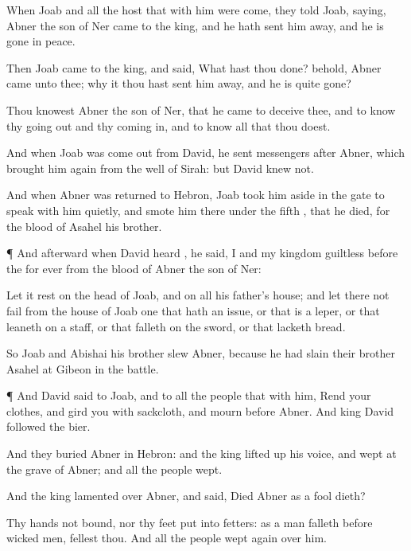 {When
Joab and all the
host that
{} with him were
come, they
told
Joab,
saying,
Abner the
son of
Ner
came to the
king, and he hath sent him
away, and he is
gone in
peace.

Then
Joab
came to the
king, and
said, What hast thou
done? behold,
Abner
came unto thee; why
{} it
{} thou hast sent him
away, and he is
quite
gone?

Thou
knowest
Abner the
son of
Ner, that he
came to
deceive thee, and to
know thy going
out and thy coming
in, and to
know all that thou
doest.

And when
Joab was come
out from
David, he
sent
messengers
after
Abner, which brought him
again from the
well of
Sirah: but
David
knew
{} not.

And when
Abner was
returned to
Hebron,
Joab took him
aside
in the
gate to
speak with him
quietly, and
smote him there under the
fifth
{}, that he
died, for the
blood of
Asahel his
brother.


\par }{\PP {}¶ And
afterward when
David
heard
{}, he
said, I and my
kingdom
{}
guiltless before the
{}
for
ever from the
blood of
Abner the
son of
Ner:

Let it
rest on the
head of
Joab, and on all his
father’s
house; and let there not
fail from the
house of
Joab one that hath an
issue, or that is a
leper, or that
leaneth on a
staff, or that
falleth on the
sword, or that
lacketh
bread.

So
Joab and
Abishai his
brother
slew
Abner, because he had
slain their
brother
Asahel at
Gibeon in the
battle.


\par }{\PP {}¶ And
David
said to
Joab, and to all the
people that
{} with him,
Rend your
clothes, and
gird you with
sackcloth, and
mourn
before
Abner. And
king
David
{}
followed the
bier.

And they
buried
Abner in
Hebron: and the
king lifted
up his
voice, and
wept at the
grave of
Abner; and all the
people
wept.

And the
king
lamented over
Abner, and
said,
Died
Abner as a
fool
dieth?

Thy
hands
{} not
bound, nor thy
feet
put into
fetters: as a man
falleth
before
wicked
men,
{}
fellest thou. And all the
people
wept
again over him.

}
